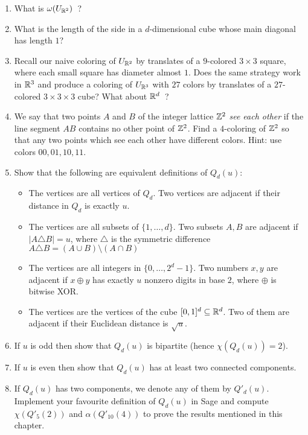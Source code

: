 \begin{enumerate}
\item What is $\omega(U_{\mathbb{R}^2})$\ ?

\item What is the length of the side in a $d$-dimensional cube whose main diagonal has length $1$?

\item Recall our naive coloring of $U_{\mathbb{R}^2}$ by translates of a $9$-colored $3\times 3$ square, where each small square has diameter almost $1$.
Does the same strategy work in $\mathbb{R}^3$ and produce a coloring of $U_{\mathbb{R}^3}$ with $27$ colors by translates of a $27$-colored $3\times 3\times 3$ cube? What about $\mathbb{R}^d$\ 	?

\item We say that two points $A$ and $B$ of the integer lattice $\mathbb{Z}^2$ \emph{see each other} if the line segment $AB$ contains no other point of $\mathbb{Z}^2$. Find a $4$-coloring of $\mathbb{Z}^2$ so that any two points which see each other have different colors. Hint: use colors $00, 01, 10, 11$.

\item Show that the following are equivalent definitions of $Q_d(u)$:

\begin{itemize}
\item The vertices are all vertices of $Q_d$. Two vertices are adjacent if their distance in $Q_d$ is exactly $u$.
\item The vertices are all subsets of $\{1,\ldots,d\}$. Two subsets $A,B$ are adjacent if $|A\triangle B|=u$, where $\triangle$ is the symmetric difference $A\triangle B=(A\cup B)\setminus (A\cap B)$
\item The vertices are all integers in $\{0,\ldots,2^d-1\}$. Two numbers $x,y$ are adjacent if $x\oplus y$ has exactly $u$ nonzero digits in base $2$, where $\oplus$ is bitwise XOR.
\item The vertices are the vertices of the cube $[0,1]^d\subseteq \mathbb{R}^d$. Two of them are adjacent if their Euclidean distance is $\sqrt{u}$.
\end{itemize}

\item If $u$ is odd then show that $Q_d(u)$ is bipartite (hence $\chi(Q_d(u))=2$).
\item If $u$ is even then show that $Q_d(u)$ has at least two connected components.

\item If $Q_d(u)$ has two components, we denote any of them by $Q'_d(u)$. Implement your favourite definition of $Q_d(u)$ in Sage and compute $\chi(Q'_5(2))$ and $\alpha(Q'_{10}(4))$ to prove the results mentioned in this chapter.
\end{enumerate}